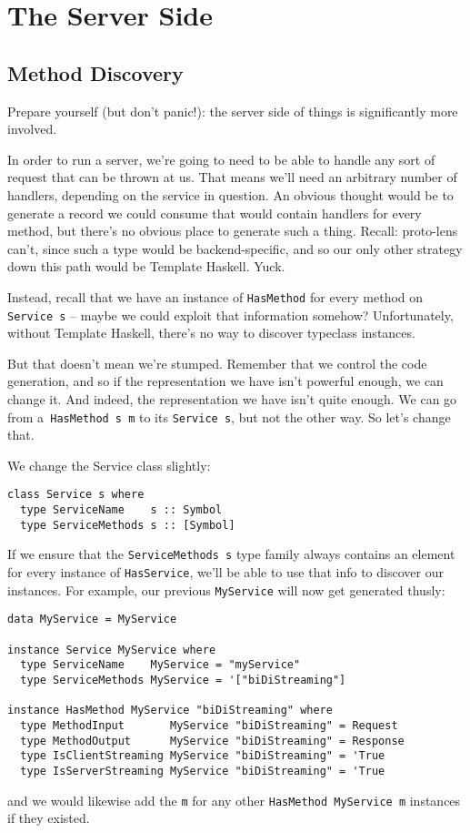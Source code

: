 \section{The Server Side}

\subsection{Method Discovery}

Prepare yourself (but don't panic!): the server side of things is significantly more involved.

In order to run a server, we're going to need to be able to handle any sort of request that can be thrown at us. That means we'll need an arbitrary number of handlers, depending on the service in question. An obvious thought would be to generate a record we could consume that would contain handlers for every method, but there's no obvious place to generate such a thing. Recall: proto-lens can't, since such a type would be backend-specific, and so our only other strategy down this path would be Template Haskell. Yuck.

Instead, recall that we have an instance of \texttt{HasMethod} for every method on \texttt{Service s} -- maybe we could exploit that information somehow? Unfortunately, without Template Haskell, there's no way to discover typeclass instances.

But that doesn't mean we're stumped. Remember that we control the code generation, and so if the representation we have isn't powerful enough, we can change it. And indeed, the representation we have isn't quite enough. We can go from a\texttt{ HasMethod s m} to its \texttt{Service s}, but not the other way. So let's change that.

We change the Service class slightly:

\begin{verbatim}
class Service s where
  type ServiceName    s :: Symbol
  type ServiceMethods s :: [Symbol]
\end{verbatim}
If we ensure that the \texttt{ServiceMethods s} type family always contains an element for every instance of \texttt{HasService}, we'll be able to use that info to discover our instances. For example, our previous \texttt{MyService} will now get generated thusly:

\begin{verbatim}
data MyService = MyService

instance Service MyService where
  type ServiceName    MyService = "myService"
  type ServiceMethods MyService = '["biDiStreaming"]

instance HasMethod MyService "biDiStreaming" where
  type MethodInput       MyService "biDiStreaming" = Request
  type MethodOutput      MyService "biDiStreaming" = Response
  type IsClientStreaming MyService "biDiStreaming" = 'True
  type IsServerStreaming MyService "biDiStreaming" = 'True
\end{verbatim}
and we would likewise add the \texttt{m} for any other \texttt{HasMethod MyService m} instances if they existed.

